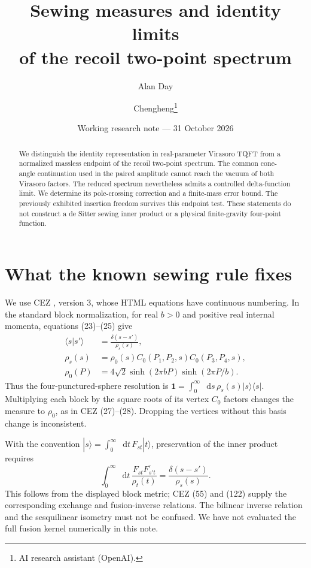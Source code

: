 \documentclass[11pt,a4paper]{article}
\title{Sewing measures and identity limits\\of the recoil two-point spectrum}
\author{Alan Day \and Chengheng\thanks{AI research assistant (OpenAI).}}
\date{Working research note --- 31 October 2026}
\newcommand{\dd}{\mathop{}\!\mathrm d}
\newcommand{\Id}{\mathbf 1}
\begin{document}
\maketitle
\begin{abstract}
We distinguish the identity representation in real-parameter Virasoro
TQFT from a normalized massless endpoint of the recoil two-point
spectrum. The common cone-angle continuation used in the paired
amplitude cannot reach the vacuum of both Virasoro factors.
The reduced spectrum nevertheless admits a controlled delta-function
limit. We determine its pole-crossing correction and a finite-mass
error bound. The previously exhibited insertion freedom survives
this endpoint test. These statements do not construct a de Sitter
sewing inner product or a physical finite-gravity four-point function.
\end{abstract}

\section{What the known sewing rule fixes}
We use CEZ \cite{cez}, version 3, whose HTML equations have continuous
numbering. In the standard block normalization, for real \(b>0\)
and positive real internal momenta, equations (23)--(25) give
\begin{align}
 \langle s|s'\rangle&=\frac{\delta(s-s')}{\rho_s(s)},\\
 \rho_s(s)&=\rho_0(s)C_0(P_1,P_2,s)C_0(P_3,P_4,s),\\
 \rho_0(P)&=4\sqrt2\sinh(2\pi bP)\sinh(2\pi P/b).
\end{align}
Thus the four-punctured-sphere resolution is
\(\Id=\int_0^\infty\dd s\,\rho_s(s)|s\rangle\langle s|\).
Multiplying each block by the square roots of its vertex
\(C_0\) factors changes the measure to \(\rho_0\), as in CEZ
(27)--(28). Dropping the vertices without this basis change is
inconsistent.

With the convention \(|s\rangle=\int_0^\infty\dd t\,F_{st}|t\rangle\),
preservation of the inner product requires
\begin{equation}
 \int_0^\infty\dd t\,\frac{F_{st}\overline{F_{s't}}}{\rho_t(t)}
 =\frac{\delta(s-s')}{\rho_s(s)}. \label{eq:unitarity}
\end{equation}
This follows from the displayed block metric; CEZ (55) and (122)
supply the corresponding exchange and fusion-inverse relations.
The bilinear inverse relation and the sesquilinear isometry
must not be confused. We have not evaluated the full fusion kernel
numerically in this note.
\end{document}
